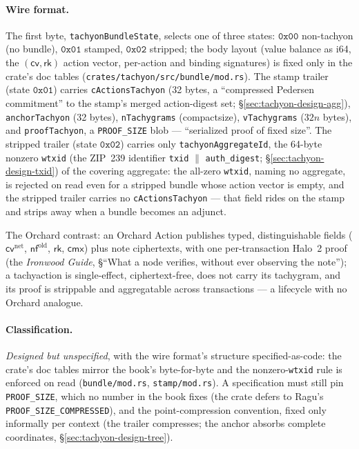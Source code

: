 \documentclass[11pt,a4paper]{article}
\theoremstyle{definition}
\newcommand{\nfsym}{\mathsf{nf}}
\newcommand{\cmx}{\mathsf{cmx}}
\newcommand{\cvsym}{\mathsf{cv}}
\newcommand{\rk}{\mathsf{rk}}
\begin{document}
\paragraph{Wire format.} The first byte, \texttt{tachyonBundleState},
selects one of three states: $\mathtt{0x00}$ non-tachyon (no bundle),
$\mathtt{0x01}$ stamped, $\mathtt{0x02}$ stripped; the body layout (value
balance as i64, the $(\cvsym, \rk)$ action vector, per-action and binding
signatures) is fixed only in the crate's doc tables
(\texttt{crates/tachyon/src/bundle/mod.rs}). The stamp trailer (state
$\mathtt{0x01}$) carries \texttt{cActionsTachyon} (32 bytes, a
``compressed Pedersen commitment'' to the stamp's merged action-digest
set; \S\ref{sec:tachyon-design-agg}), \texttt{anchorTachyon} (32 bytes),
\texttt{nTachygrams} (compactsize), \texttt{vTachygrams} ($32n$ bytes),
and \texttt{proofTachyon}, a \texttt{PROOF\_SIZE} blob --- ``serialized
proof of fixed size''. The stripped trailer (state $\mathtt{0x02}$)
carries only \texttt{tachyonAggregateId}, the 64-byte nonzero
\texttt{wtxid} (the ZIP~239 identifier \texttt{txid} $\|$
\texttt{auth\_digest}; \S\ref{sec:tachyon-design-txid}) of the covering
aggregate: the all-zero \texttt{wtxid},
naming no aggregate, is rejected on read even for a stripped bundle
whose action vector is empty, and
the stripped trailer carries no \texttt{cActionsTachyon} --- that field
rides on the stamp and strips away when a bundle becomes an adjunct.

The Orchard contrast: an Orchard Action publishes typed, distinguishable
fields ($\cvsym^{\mathrm{net}}$, $\nfsym^{\mathrm{old}}$, $\rk$, $\cmx$)
plus note ciphertexts, with one per-transaction Halo~2 proof (the
\emph{Ironwood Guide}, \S``What a node verifies, without ever observing the
note''); a tachyaction is single-effect, ciphertext-free, does not carry
its tachygram, and its proof is strippable and aggregatable across
transactions --- a lifecycle with no Orchard analogue.

\paragraph{Classification.} \emph{Designed but unspecified}, with the wire
format's structure specified-as-code: the crate's doc tables mirror the
book's byte-for-byte and the nonzero-\texttt{wtxid} rule is enforced on
read (\texttt{bundle/mod.rs}, \texttt{stamp/mod.rs}). A specification must
still pin \texttt{PROOF\_SIZE}, which no number in the book fixes (the
crate defers to Ragu's \texttt{PROOF\_SIZE\_COMPRESSED}), and the
point-compression convention, fixed only informally per context (the
trailer compresses; the anchor absorbs complete coordinates,
\S\ref{sec:tachyon-design-tree}).
\end{document}
